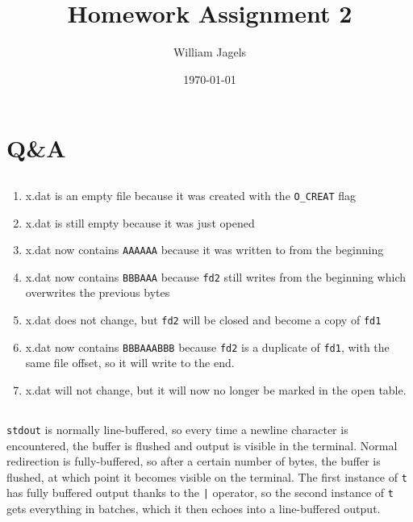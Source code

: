 \documentclass[a4paper,11pt]{article}
\title{Homework Assignment 2}
\author{William Jagels}
\date{\today}
\def\code#1{\texttt{#1}}
\begin{document}
\maketitle

\section{Q\&A}

\subsection{}
\begin{enumerate}
  \item x.dat is an empty file because it was created with the \code{O\_CREAT} flag
  \item x.dat is still empty because it was just opened
  \item x.dat now contains \code{AAAAAA} because it was written to from the beginning
  \item x.dat now contains \code{BBBAAA} because \code{fd2} still writes from the beginning
    which overwrites the previous bytes
  \item x.dat does not change, but \code{fd2} will be closed and become a copy of \code{fd1}
  \item x.dat now contains \code{BBBAAABBB} because \code{fd2} is a duplicate of \code{fd1}, with
    the same file offset, so it will write to the end.
  \item x.dat will not change, but it will now no longer be marked in the open table.
\end{enumerate}

\subsection{}
\code{stdout} is normally line-buffered, so every time a newline character is encountered,
the buffer is flushed and output is visible in the terminal.
Normal redirection is fully-buffered, so after a certain number of bytes, the buffer is flushed,
at which point it becomes visible on the terminal.
The first instance of \code{t} has fully buffered output thanks to the \code{|} operator, so
the second instance of \code{t} gets everything in batches, which it then echoes into a
line-buffered output.
\end{document}
